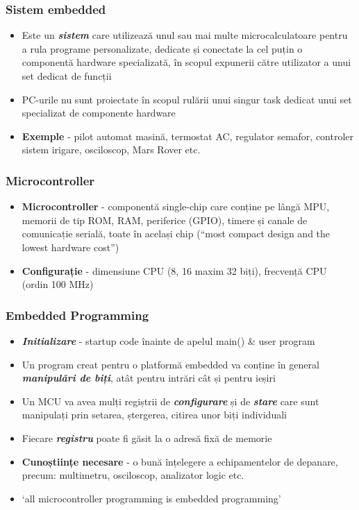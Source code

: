 \documentclass[xcolor={table}]{beamer}
\begin{document}
		\begin{frame}
			\frametitle{Sistem embedded}
			\begin{itemize}
				\item Este un \textbf{\textit{sistem}} care utilizează unul sau mai multe microcalculatoare pentru a rula programe personalizate, dedicate și conectate la cel puțin o componentă hardware specializată, în scopul expunerii către utilizator a unui set dedicat de funcții
				\item PC-urile nu sunt proiectate în scopul rulării unui singur task dedicat unui set specializat de componente hardware
				\item \textbf{Exemple} - pilot automat masină, termostat AC, regulator semafor, controler sistem irigare, osciloscop, Mars Rover etc.
			\end{itemize}
		\end{frame}
		
		\begin{frame}{}
		    \frametitle{Microcontroller}
		    \begin{itemize}
		    \item \textbf{Microcontroller} - componentă single-chip care conține pe lângă MPU, memorii de tip ROM, RAM, periferice (GPIO), timere și canale de comunicație serială, toate în același chip (“most compact design and the lowest hardware cost”)
		    \item \textbf{Configurație} -  dimensiune CPU (8, 16 maxim 32 biți), frecvență CPU (ordin 100 MHz)
		    \end{itemize}
		    
		\end{frame}
		
		\begin{frame}{}
		    \frametitle{Embedded Programming}
		    \begin{itemize}
		    \item \textbf{\textit{Initializare}} -  startup code înainte de apelul main() \& user program
		    \item Un program creat pentru o platformă embedded va conține în general \textbf{\textit{manipulări de biți}}, atât pentru intrări cât și pentru ieșiri
            \item Un MCU va avea mulți regiștrii de \textbf{\textit{configurare}} și de \textbf{\textit{stare}} care sunt manipulați prin setarea, ștergerea, citirea unor biți individuali 
            \item Fiecare \textbf{\textit{registru}} poate fi găsit la o adresă fixă de memorie
		    \item \textbf{Cunoștiințe necesare} -  o bună înțelegere a echipamentelor de depanare, precum: multimetru, osciloscop, analizator logic etc.
		    \item `all microcontroller programming is embedded programming'
		    \end{itemize}
		    
		\end{frame}
\end{document}
